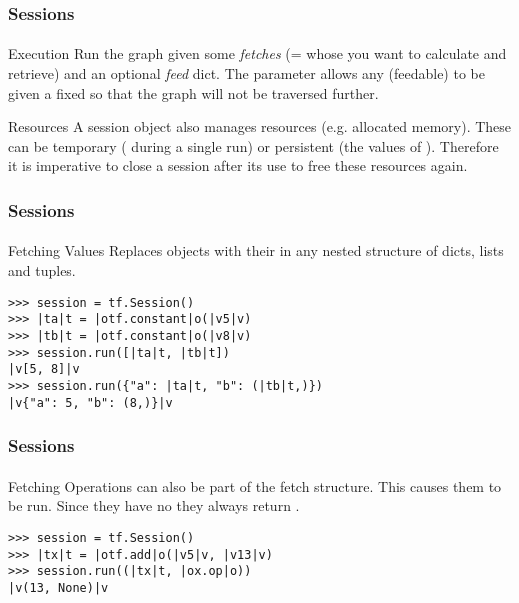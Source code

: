 \begin{frame}
    \frametitle{Sessions}
    \framesubtitle{}
    \begin{block}{Execution}
        Run the graph given some \emph{fetches} (=  whose  you want to calculate and retrieve)
        and an optional \emph{feed} dict. The  parameter allows any (feedable)  to be given a fixed  so that the graph will not be traversed further.
    \end{block}
    \begin{block}{Resources}
        A session object also manages resources (e.g. allocated memory). 
        These can be temporary ( during a single run) or persistent (the values of ). 
        Therefore it is imperative to close a session after its use to free these resources again. 
    \end{block}
\end{frame}

\begin{frame}[fragile]
    \frametitle{Sessions}
    \framesubtitle{}
    \begin{block}{Fetching Values}
        Replaces  objects with their  in any nested structure of dicts, lists and tuples.
        \pause
        \begin{lstlisting}
>>> session = tf.Session()
>>> |ta|t = |otf.constant|o(|v5|v)
>>> |tb|t = |otf.constant|o(|v8|v)
>>> session.run([|ta|t, |tb|t])
|v[5, 8]|v
>>> session.run({"a": |ta|t, "b": (|tb|t,)})  
|v{"a": 5, "b": (8,)}|v
        \end{lstlisting}
    \end{block}
\end{frame}

\begin{frame}[fragile]
    \frametitle{Sessions}
    \framesubtitle{}
    \begin{block}{Fetching Operations}
         can also be part of the fetch structure. This causes them to be run. 
        Since they have no  they always return .
        \pause
        \begin{lstlisting}
>>> session = tf.Session()
>>> |tx|t = |otf.add|o(|v5|v, |v13|v)
>>> session.run((|tx|t, |ox.op|o))
|v(13, None)|v
        \end{lstlisting}
    \end{block}
\end{frame}

